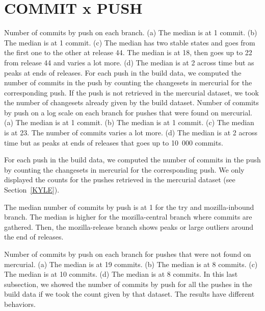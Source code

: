 \section{COMMIT x PUSH}
\label{commit_push_sec}
{
    Number of commits by push on each branch. (a) The median is at 1 commit. (b) The median is at 1 commit. (c) The median has two stable states and goes from the first one to the other at release 44. The median is at 18, then goes up to 22 from release 44 and varies a lot more. (d) The median is at 2 across time but as peaks at ends of releases.
}
{
    For each push in the build data, we computed the number of commits in the push by counting the changesets in mercurial for the corresponding push. If the push is not retrieved in the mercurial dataset, we took the number of changesets already given by the build dataset.
}
{
    Number of commits by push on a log scale on each branch for pushes that were found on mercurial. (a) The median is at 1 commit. (b) The median is at 1 commit. (c) The median is at 23. The number of commits varies a lot more. (d) The median is at 2 across time but as peaks at ends of releases that goes up to 10~000 commits.
}
{
   For each push in the build data, we computed the number of commits in the push by counting the changesets in mercurial for the corresponding push. We only displayed the counts for the pushes retrieved in the mercurial dataset (see Section~\ref{KYLE}).
   
   The median number of commits by push is at 1 for the try and mozilla-inbound branch. The median is higher for the mozilla-central branch where commits are gathered. Then, the mozilla-release branch shows peaks or large outliers around the end of releases.
   
}
{
    Number of commits by push on each branch for pushes that were not found on mercurial. (a) The median is at 19 commits. (b) The median is at 8 commits. (c) The median is at 10 commits. (d) The median is at 8 commits.
}
{
    In this last subsection, we showed the number of commits by push for all the pushes in the build data if we took the count given by that dataset. The results have different behaviors.
}
